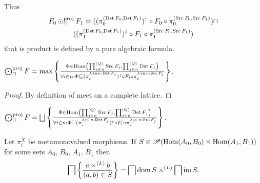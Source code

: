 \begin{rem}
  Thus
\begin{multline*}
  F_0 \odot^{\text{proj}}_{\sqcap} F_1 = ((\pi^{(\operatorname{Dst} F_0 , \operatorname{Dst}
  F_1)}_0)^{\dagger} \circ F_0 \circ \pi^{(\operatorname{Src} F_0 , \operatorname{Src}
  F_1)}_0) \sqcap\\ ((\pi^{(\operatorname{Dst} F_0 , \operatorname{Dst} F_1)}_1)^{\dagger}
  \circ F_1 \circ \pi^{(\operatorname{Src} F_0 , \operatorname{Src} F_1)}_1)
\end{multline*}
  that is product is defined by a pure algebraic formula.
\end{rem}

\begin{prop}
  $\bigodot^{\text{proj}}_{\sqcap} F = \max \left\{ \frac{ \Phi \in \operatorname{Hom} \left( \prod^{(Q)}_{j \in
  n} \operatorname{Src} F_j , \prod^{(Q)}_{j \in n} \operatorname{Dst} F_j \right)
  }{ \forall i \in n : \Phi \sqsubseteq (\pi^{\lambda
  j \in n : \operatorname{Dst} F_j}_i)^{\dagger} \circ F_i \circ \pi^{\lambda j \in n
  : \operatorname{Src} F_j}_i }\right\}$.
\end{prop}

\begin{proof}
  By definition of meet on a complete lattice.
\end{proof}

\begin{cor}
  $\bigodot^{\text{proj}}_{\sqcap} F = \bigsqcup \setcond{ \Phi \in \Hom \left( \prod^{(Q)}_{j
  \in n} \Src F_j , \prod^{(Q)}_{j \in n} \Dst F_j \right)
  }{ \forall i \in n : \Phi \sqsubseteq (\pi^{\lambda
  j \in n : \Dst F_j}_i)^{\dagger} \circ F_i \circ \pi^{\lambda j \in n
  : \Src F_j}_i }$.
\end{cor}

\begin{thm}
  Let $\pi^X_i$ be metamonovalued morphisms. If $S \in \mathscr{P} (\operatorname{Hom}
  (A_0 , B_0) \times \operatorname{Hom} (A_1 , B_1))$ for some sets $A_0$, $B_0$,
  $A_1$, $B_1$ then
  \[ \bigsqcap \left\{ \frac{ a \times^{(L)} b }{(a , b)\in S }\right\} =
     \bigsqcap \operatorname{dom} S \times^{(L)} \bigsqcap \operatorname{im} S. \]
\end{thm}

